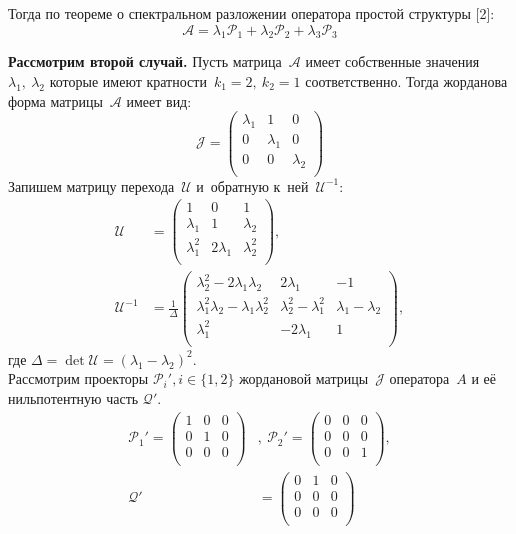 Тогда по теореме о спектральном разложении оператора простой структуры [2]:
$$
	\mathcal{A} = \lambda_1\mathcal{P}_1 + \lambda_2\mathcal{P}_2 + \lambda_3\mathcal{P}_3 
$$

\textbf{Рассмотрим второй случай.} 		
Пусть матрица~$\mathcal{A}$ имеет собственные значения~$\lambda_1,~\lambda_2$ 
которые имеют кратности~$k_1=2,~k_2=1$ соответственно. Тогда жорданова форма матрицы~$\mathcal{A}$ имеет вид:
$$
 \mathcal{J} = 
 \begin{pmatrix}
  \lambda_1 & 1 & 0\\
  0 & \lambda_1 & 0 \\
  0 & 0 & \lambda_2 \\
 \end{pmatrix}
$$
Запишем матрицу перехода~$\mathcal{U}$ и~обратную к~ней~$\mathcal{U}^{-1}$:
$$
\begin{aligned}
 \mathcal{U} &= 
 \begin{pmatrix}
  	1 & 0 & 1\\
  	\lambda_1 & 1 & \lambda_2 \\
  	\lambda_1^2 & 2\lambda_1 & \lambda_2^2 \\
 \end{pmatrix}, \\
 \mathcal{U}^{-1} &= \frac{1}{\Delta} 
 \begin{pmatrix}
  	\lambda_2^2-2\lambda_1\lambda_2 & 2\lambda_1 & -1  \\
  	\lambda_1^2\lambda_2 - \lambda_1\lambda_2^2 & \lambda_2^2 - \lambda_1^2 & \lambda_1 - \lambda_2  \\
  	\lambda_1^2 & -2\lambda_1 & 1  \\
 \end{pmatrix},
\end{aligned}
$$
где $\Delta = \det \mathcal{U} = (\lambda_1-\lambda_2)^2$. \\
Рассмотрим проекторы $\mathcal{P}_i', i \in \{1,2\}$ жордановой матрицы~$\mathcal{J}$ оператора~$A$ и её нильпотентную часть $\mathcal{Q}'$.
$$
\begin{aligned}
\mathcal{P}_1' = 
		\begin{pmatrix}
  			1 & 0 & 0\\
  			0 & 1 & 0 \\
  			0 & 0 & 0 \\
 		\end{pmatrix}&,\  
 		\mathcal{P}_2' =
		\begin{pmatrix}
  			0 & 0 & 0\\
  			0 & 0 & 0 \\
  			0 & 0 & 1 \\
 		\end{pmatrix},\\
 		 \mathcal{Q}' &= 
		\begin{pmatrix}
  			0 & 1 & 0\\
  			0 & 0 & 0 \\
  			0 & 0 & 0 \\
 		\end{pmatrix}
\end{aligned}
$$

